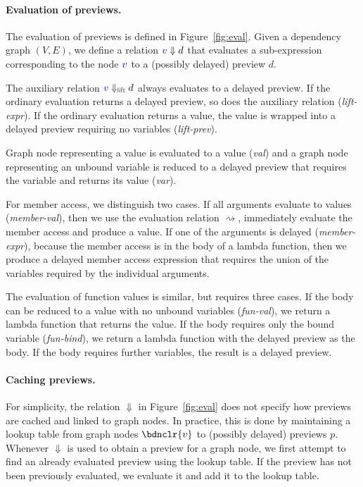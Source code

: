 \documentclass[acmsmall,anonymous,fleqn]{acmart}\settopmatter{printfolios=false,printccs=false,printacmref=false}
\theoremstyle{plain}
\theoremstyle{definition}
\newcommand{\ident}[1]{\textnormal{\textcolor{idclr}{\sffamily #1}}}
\newcommand{\bndclr}[1]{\textcolor{kvdclr}{#1}}
\begin{document}
\paragraph{Evaluation of previews.}
The evaluation of previews is defined in Figure~\ref{fig:eval}. Given a dependency graph $(V, E)$,
we define a relation $\bndclr{v}\Downarrow d$ that evaluates a sub-expression corresponding to
the node $\bndclr{v}$ to a (possibly delayed) preview $d$.

The auxiliary relation $\bndclr{v}\Downarrow_{\ident{lift}} d$ always evaluates
to a delayed preview. If the ordinary evaluation returns a delayed preview, so does the auxiliary
relation (\emph{lift-expr}). If the ordinary evaluation returns a value, the value is wrapped
into a delayed preview requiring no variables (\emph{lift-prev}).

Graph node representing a value is evaluated to a value (\emph{val}) and a graph node representing
an unbound variable is reduced to a delayed preview that requires the variable and returns its
value (\emph{var}).

For member access, we distinguish two cases. If all arguments evaluate to values (\emph{member-val}),
then we use the evaluation relation $\rightsquigarrow$, immediately evaluate the member access and
produce a value. If one of the arguments is delayed (\emph{member-expr}), because the member access
is in the body of a lambda function, then we produce a delayed member access expression that
requires the union of the variables required by the individual arguments.

The evaluation of function values is similar, but requires three cases. If the body can
be reduced to a value with no unbound variables (\emph{fun-val}), we return a lambda function that
returns the value. If the body requires only the bound variable (\emph{fun-bind}), we return a
lambda function with the delayed preview as the body. If the body requires further variables,
the result is a delayed preview.

\paragraph{Caching previews.}
For simplicity, the relation $\Downarrow$ in Figure~\ref{fig:eval} does not specify how previews
are cached and linked to graph nodes. In practice, this is done by maintaining a lookup table
from graph nodes $\bdnclr{v}$ to (possibly delayed) previews $p$.
Whenever $\Downarrow$ is used to obtain a preview for a graph node, we first
attempt to find an already evaluated preview using the lookup table. If the preview has not
been previously evaluated, we evaluate it and add it to the lookup table.
\end{document}
